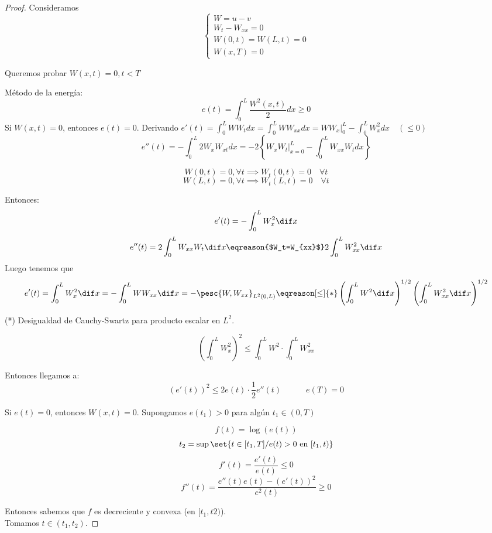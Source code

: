 		\begin{proof}
			Consideramos
			\[\begin{cases}
				W = u-v\\
				W_t - W_{xx} = 0 \\
				W(0,t) = W(L,t) = 0\\
				W(x,T) = 0
			\end{cases}\]

			Queremos probar $W(x,t) = 0, t < T$

			Método de la energía:
			\[ e(t) = \int_0^L \frac{W^2(x,t)}{2} dx \geq 0 \]
			Si $W(x,t) = 0$, entonces $e(t) = 0$. Derivando
			\( e'(t) = \int_0^L WW_t dx = \int_0^L W W_{xx} dx = \left. W W_x \right|_0^L - \int_0^L W^2_x dx \quad (\leq 0) \)
			\[ e''(t) = - \int^L_0 2W_x W_{xt} dx = -2 \left\{ \left. W_x W_t \right|^L_{x=0} - \int_0^L W_{xx} W_t dx \right\} \]

			\[W(0,t)  = 0, \forall t \implies  W_t(0,t) = 0\quad \forall t \]
			\[W(L,t)  = 0, \forall t \implies  W_t(L,t) = 0\quad \forall t \]

			Entonces:
			\[ e'(t) = - \int_0^L W^2_x \dif x \]
			\[ e''(t) = 2 \int_0^L W_{xx} W_t \dif x \eqreason{$W_t=W_{xx}$} 2 \int_0^L W_{xx}^2 \dif x \]
			Luego tenemos que
			\[ e'(t) = \int_0^L W_x^2 \dif x = - \int_0^L W W_{xx} \dif x = - \pesc{W, W_{xx}}_{L^2(0,L)} \eqreason[\leq]{*} \left(\int_0^L W^2 \dif x \right)^{1/2} \left( \int_0^L W_{xx}^2 \dif x \right)^{1/2} \]

			\obs (*) Desigualdad de Cauchy-Swartz para producto escalar en $L^2$.

			\[ \left( \int_0^L W^2_x  \right)^{2} \leq \int_0^L W^2 \cdot \int_0^L W_{xx}^2 \]

			Entonces llegamos a:
			\[ (e'(t))^2  \leq 2 e(t) \cdot \frac{1}{2} e''(t) \quad\quad\quad e(T) = 0 \]

			Si $e(t) = 0$, entonces $W(x,t) = 0$. Supongamos $e(t_1) > 0$ para algún $t_1 \in (0,T)$

			\begin{minipage}[t]{\linewidth}
			\end{minipage}

			\[f(t) = \log (e(t))\]
			\[t_2 = \sup \set{ t \in [t_1,T] / e(t) > 0 \text{ en } [t_1,t) } \]
			\[f'(t) = \frac{e'(t)}{e(t)} \leq 0\]
			\[f''(t) = \frac{e''(t) e(t)- (e'(t))^2}{e^2(t)} \geq 0\]

			Entonces sabemos que $f$ es decreciente y convexa (en $[t_1,t2)$).\\
			Tomamos $t \in ( t_1 , t_2 )$.


\end{proof}
